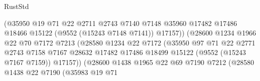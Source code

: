 \begin{lexlean}{RustStd}
\begin{coremodule}
                                      (@35950
                                        @19
                                        @71
                                        @22
                                        @2711
                                        @2743
                                        @7140
                                        @7148
                                        @35960
                                        @17482
                                        @17486
                                        @18466
                                        @15122
                                        (@9552 (@15243 @7148 @7141))
                                        @17157))
                                    (@28600
                                      @1234
                                      @1966
                                      @22
                                      @70
                                      @7172
                                      @7213
                                      (@28580
                                        @1234
                                        @22
                                        @7172
                                        (@35950
                                          @97
                                          @71
                                          @22
                                          @2771
                                          @2743
                                          @7158
                                          @7167
                                          @28632
                                          @17482
                                          @17486
                                          @18499
                                          @15122
                                          (@9552 (@15243 @7167 @7159))
                                          @17157))
                                      (@28600
                                        @1438
                                        @1965
                                        @22
                                        @69
                                        @7190
                                        @7212
                                        (@28580
                                          @1438
                                          @22
                                          @7190
                                          (@35983
                                            @19
                                            @71

\end{coremodule}
\end{lexlean}
